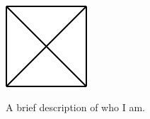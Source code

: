 \documentclass[a4paper]{cv-michele}
\begin{document}

\Header

\vspace{10pt}

\begin{minipage}[t]{0.23\linewidth}



\includegraphics[width=\textwidth]{me}

\vspace{15pt}


%


A brief description of who I am.

\end{minipage}
\hfill
\end{document}
